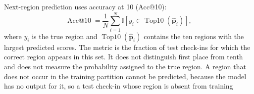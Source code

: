 Next-region prediction uses accuracy at 10 (Acc@10):
\begin{equation}\label{eq:fund:acc10}
    \operatorname{Acc@10} = \frac{1}{N}\sum_{i=1}^{N}
    \mathbb{I}\!\left[y_i \in \operatorname{Top10}(\hat{\mathbf{p}}_i)\right],
\end{equation}
where $y_i$ is the true region and $\operatorname{Top10}(\hat{\mathbf{p}}_i)$ contains
the ten regions with the largest predicted scores. The metric is the fraction of test
check-ins for which the correct region appears in this set. It does not distinguish
first place from tenth and does not measure the probability assigned to the true
region.
A region that does not occur in the training partition cannot be predicted, because the
model has no output for it, so a test check-in whose region is absent from training
